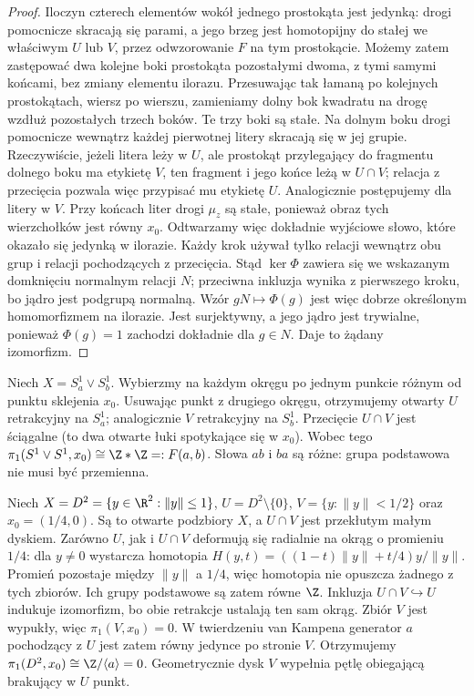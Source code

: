 \begin{proof}
Iloczyn czterech elementów wokół jednego prostokąta jest jedynką:
drogi pomocnicze skracają się parami, a jego brzeg jest homotopijny
do stałej we właściwym $U$ lub $V$, przez odwzorowanie $F$ na tym prostokącie.
Możemy zatem zastępować dwa kolejne boki prostokąta pozostałymi
dwoma, z tymi samymi końcami, bez zmiany elementu ilorazu.
Przesuwając tak łamaną po kolejnych prostokątach, wiersz po wierszu,
zamieniamy dolny bok kwadratu na drogę wzdłuż pozostałych trzech boków.
Te trzy boki są stałe. Na dolnym boku drogi pomocnicze wewnątrz
każdej pierwotnej litery skracają się w jej grupie.
Rzeczywiście, jeżeli litera leży w $U$, ale prostokąt
przylegający do fragmentu dolnego boku ma etykietę $V$,
ten fragment i jego końce leżą w $U\cap V$; relacja
z przecięcia pozwala więc przypisać mu etykietę $U$.
Analogicznie postępujemy dla litery w $V$.
Przy końcach liter drogi $\mu_z$ są stałe, ponieważ
obraz tych wierzchołków jest równy $x_0$.
Odtwarzamy więc dokładnie wyjściowe słowo,
które okazało się jedynką w ilorazie. Każdy krok używał tylko
relacji wewnątrz obu grup i relacji pochodzących z przecięcia.
Stąd $\ker\Phi$ zawiera się we wskazanym domknięciu normalnym
relacji $N$; przeciwna inkluzja wynika z pierwszego kroku,
bo jądro jest podgrupą normalną. Wzór $gN\mapsto\Phi(g)$
jest więc dobrze określonym homomorfizmem na ilorazie.
Jest surjektywny, a jego jądro jest trywialne, ponieważ
$\Phi(g)=1$ zachodzi dokładnie dla $g\in N$. Daje to żądany izomorfizm.
\end{proof}

\begin{przyklad}
\label{prz:pi1-dwa-okregi}
Niech $X=S^1_a\vee S^1_b$.
Wybierzmy na każdym okręgu po jednym
punkcie różnym od punktu sklejenia
$x_0$. Usuwając punkt z drugiego
okręgu, otrzymujemy otwarty $U$
retrakcyjny na $S^1_a$; analogicznie
$V$ retrakcyjny na $S^1_b$.
Przecięcie $U\cap V$ jest ściągalne
(to dwa otwarte łuki spotykające się
w $x_0$). Wobec tego
$\pi_1(S^1\vee S^1,x_0)\cong\Z*\Z=:F(a,b)$.
Słowa $ab$ i $ba$ są różne:
grupa podstawowa nie musi być przemienna.
\end{przyklad}

\begin{przyklad}
\label{prz:van-kampen-dysk}
Niech $X=D^2=\{y\in\R^2:\|y\|\leq1\}$,
$U=D^2\setminus\{0\}$, $V=\{y:\|y\|<1/2\}$
oraz $x_0=(1/4,0)$. Są to otwarte podzbiory $X$,
a $U\cap V$ jest przekłutym małym dyskiem.
Zarówno $U$, jak i $U\cap V$ deformują się radialnie
na okrąg o promieniu $1/4$: dla $y\ne0$ wystarcza
homotopia $H(y,t)=((1-t)\|y\|+t/4)y/\|y\|$.
Promień pozostaje między $\|y\|$ a $1/4$,
więc homotopia nie opuszcza żadnego z tych zbiorów.
Ich grupy podstawowe są zatem równe $\Z$.
Inkluzja $U\cap V\hookrightarrow U$
indukuje izomorfizm, bo obie retrakcje ustalają
ten sam okrąg. Zbiór $V$ jest wypukły, więc
$\pi_1(V,x_0)=0$. W twierdzeniu van Kampena
generator $a$ pochodzący z $U$ jest zatem równy
jedynce po stronie $V$. Otrzymujemy
$\pi_1(D^2,x_0)\cong\Z/\langle a\rangle=0$.
Geometrycznie dysk $V$ wypełnia pętlę obiegającą
brakujący w $U$ punkt.
\end{przyklad}

